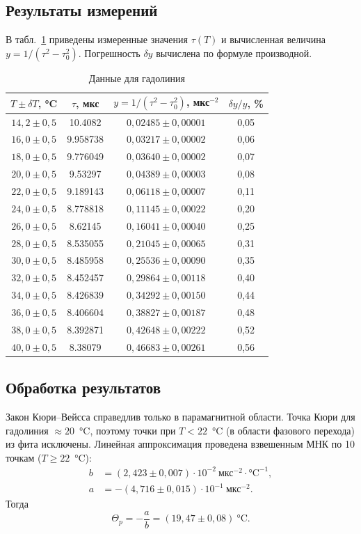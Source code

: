 \documentclass[a4paper,12pt]{article}
\begin{document}
	\subsection{Результаты измерений}
	В табл.~\ref{tab:curie} приведены измеренные значения $\tau(T)$ и вычисленная величина $y = 1/(\tau^2 - \tau_0^2)$. Погрешность $\delta y$ вычислена по формуле производной.
	
	\begin{table}[H]
		\centering
		\caption{Данные для гадолиния}
		\label{tab:curie}
		\begin{tabular}{cccc}
			\toprule
			$T \pm \delta T$, °C & $\tau$, мкс & $y = 1/(\tau^2 - \tau_0^2)$, мкс$^{-2}$ & $\delta y / y$, \% \\
			\midrule
			$14{,}2 \pm 0{,}5$ & 10.4082 & $0{,}02485 \pm 0{,}00001$ & 0{,}05 \\
			$16{,}0 \pm 0{,}5$ & 9.958738 & $0{,}03217 \pm 0{,}00002$ & 0{,}06 \\
			$18{,}0 \pm 0{,}5$ & 9.776049 & $0{,}03640 \pm 0{,}00002$ & 0{,}07 \\
			$20{,}0 \pm 0{,}5$ & 9.53297  & $0{,}04389 \pm 0{,}00003$ & 0{,}08 \\
			$22{,}0 \pm 0{,}5$ & 9.189143 & $0{,}06118 \pm 0{,}00007$ & 0{,}11 \\
			$24{,}0 \pm 0{,}5$ & 8.778818 & $0{,}11145 \pm 0{,}00022$ & 0{,}20 \\
			$26{,}0 \pm 0{,}5$ & 8.62145  & $0{,}16041 \pm 0{,}00040$ & 0{,}25 \\
			$28{,}0 \pm 0{,}5$ & 8.535055 & $0{,}21045 \pm 0{,}00065$ & 0{,}31 \\
			$30{,}0 \pm 0{,}5$ & 8.485958 & $0{,}25536 \pm 0{,}00090$ & 0{,}35 \\
			$32{,}0 \pm 0{,}5$ & 8.452457 & $0{,}29864 \pm 0{,}00118$ & 0{,}40 \\
			$34{,}0 \pm 0{,}5$ & 8.426839 & $0{,}34292 \pm 0{,}00150$ & 0{,}44 \\
			$36{,}0 \pm 0{,}5$ & 8.406604 & $0{,}38827 \pm 0{,}00187$ & 0{,}48 \\
			$38{,}0 \pm 0{,}5$ & 8.392871 & $0{,}42648 \pm 0{,}00222$ & 0{,}52 \\
			$40{,}0 \pm 0{,}5$ & 8.38079  & $0{,}46683 \pm 0{,}00261$ & 0{,}56 \\
			\bottomrule
		\end{tabular}
	\end{table}
	
	\subsection{Обработка результатов}
	Закон Кюри--Вейсса справедлив только в парамагнитной области. Точка Кюри для гадолиния $\approx 20$~°C, поэтому точки при $T < 22$~°C (в области фазового перехода) из фита исключены. Линейная аппроксимация проведена взвешенным МНК по 10 точкам ($T \ge 22$~°C):
	\begin{align}
		b &= (2{,}423 \pm 0{,}007)\cdot 10^{-2}\ \text{мкс}^{-2}\cdot\text{°C}^{-1},\\
		a &= -(4{,}716 \pm 0{,}015)\cdot 10^{-1}\ \text{мкс}^{-2}.
	\end{align}
	Тогда
	\[
	\Theta_p = -\frac{a}{b} = (19{,}47 \pm 0{,}08)\ \text{°C}.
	\]
	
\end{document}
